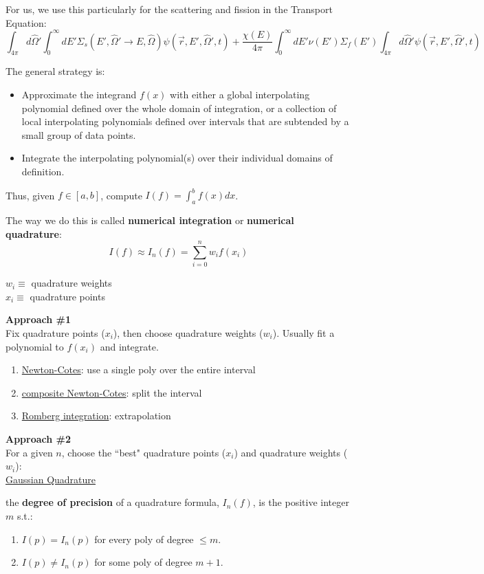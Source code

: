 \documentclass[12pt]{article}
\newcommand{\vOmega}{\ensuremath{\hat{\Omega}}}
\begin{document}
For us, we use this particularly for the scattering and fission in the Transport Equation:
\[\int_{4\pi} d\vOmega' \int_0^{\infty} dE' \Sigma_s(E', \vOmega' \rightarrow E, \vOmega) \psi(\vec{r}, E', \vOmega', t)  +
 \frac{\chi(E)}{4\pi} \int_0^{\infty} dE' \nu(E') \Sigma_f(E') \int_{4\pi} d\vOmega' \psi(\vec{r}, E', \vOmega', t) \]

The general strategy is:
\begin{itemize}
\item Approximate the integrand $f(x)$ with either a global interpolating
polynomial defined over the whole domain of integration, or a
collection of local interpolating polynomials defined over intervals
that are subtended by a small group of data points.
\item Integrate the interpolating polynomial(s) over their individual
domains of definition.
\end{itemize}

Thus, given $f \in[a,b]$, compute $I(f) = \int_a^b f(x) dx$.

The way we do this is called \textbf{numerical integration} or \textbf{numerical quadrature}:
\[I(f) \approx I_n(f) = \sum_{i=0}^n w_i f(x_i)\]
\vspace*{-3em}

$w_i \equiv$ quadrature weights\\
$x_i \equiv$ quadrature points

\textbf{Approach \#1}\\
Fix quadrature points ($x_i$), then choose quadrature weights ($w_i$). Usually fit a polynomial to $f(x_i)$ and integrate.
%
\begin{enumerate}%
\item \underline{Newton-Cotes}: use a single poly over the entire interval
\item \underline{composite Newton-Cotes}: split the interval
\item \underline{Romberg integration}: extrapolation
\end{enumerate}

\textbf{Approach \#2}\\
For a given $n$, choose the ``best" quadrature points ($x_i$) and quadrature weights ($w_i$):\\
\underline{Gaussian Quadrature}

\vspace*{1em}
the \textbf{degree of precision} of a quadrature formula, $I_n(f)$, is the positive integer $m$ s.t.:
\begin{enumerate}
\item $I(p) = I_n(p)$ for every poly of degree $\leq m$.
\item $I(p) \neq I_n(p)$ for some poly of degree $m+1$.
\end{enumerate}
 
\end{document}
